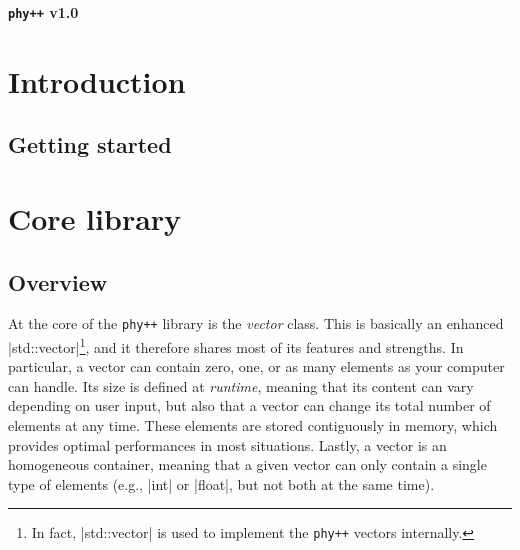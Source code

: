 \documentclass[12pt]{report}
\newcommand{\phypp}{\texttt{phy++}\xspace}
\newcommand{\stdvec}{\cppinline|std::vector|\xspace}
\begin{document}
\begin{center}
\Large \bf \phypp v1.0
\end{center}

\tableofcontents

\chapter{Introduction \label{SEC:intro}}

\section{Getting started \label{SEC:start}}

\chapter{Core library \label{SEC:core}}

\section{Overview \label{SEC:core:overview}}
At the core of the \phypp library is the \emph{vector} class. This is basically an enhanced \stdvec\footnote{In fact, \stdvec is used to implement the \phypp vectors internally.}, and it therefore shares most of its features and strengths. In particular, a vector can contain zero, one, or as many elements as your computer can handle. Its size is defined at \emph{runtime}, meaning that its content can vary depending on user input, but also that a vector can change its total number of elements at any time. These elements are stored contiguously in memory, which provides optimal performances in most situations. Lastly, a vector is an homogeneous container, meaning that a given vector can only contain a single type of elements (e.g., \cppinline|int| or \cppinline|float|, but not both at the same time).
\end{document}
